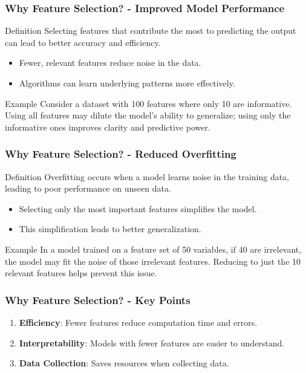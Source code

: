 \documentclass{beamer}
\begin{document}
\begin{frame}[fragile]
    \frametitle{Why Feature Selection? - Improved Model Performance}
    \begin{block}{Definition}
        Selecting features that contribute the most to predicting the output can lead to better accuracy and efficiency.
    \end{block}
    \begin{itemize}
        \item Fewer, relevant features reduce noise in the data.
        \item Algorithms can learn underlying patterns more effectively.
    \end{itemize}
    \begin{block}{Example}
        Consider a dataset with 100 features where only 10 are informative. 
        Using all features may dilute the model's ability to generalize; using only the informative ones improves clarity and predictive power.
    \end{block}
\end{frame}

\begin{frame}[fragile]
    \frametitle{Why Feature Selection? - Reduced Overfitting}
    \begin{block}{Definition}
        Overfitting occurs when a model learns noise in the training data, leading to poor performance on unseen data.
    \end{block}
    \begin{itemize}
        \item Selecting only the most important features simplifies the model.
        \item This simplification leads to better generalization.
    \end{itemize}
    \begin{block}{Example}
        In a model trained on a feature set of 50 variables, if 40 are irrelevant, the model may fit the noise of those irrelevant features.
        Reducing to just the 10 relevant features helps prevent this issue.
    \end{block}
\end{frame}

\begin{frame}[fragile]
    \frametitle{Why Feature Selection? - Key Points}
    \begin{enumerate}
        \item \textbf{Efficiency}: Fewer features reduce computation time and errors.
        \item \textbf{Interpretability}: Models with fewer features are easier to understand.
        \item \textbf{Data Collection}: Saves resources when collecting data.
    \end{enumerate}
\end{frame}
\end{document}
